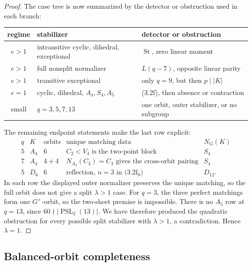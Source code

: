 \documentclass[11pt]{article}
\theoremstyle{definition}
\theoremstyle{remark}
\begin{document}
\begin{proof}
The case tree is now summarized by the detector or obstruction used in
each branch:
\begin{center}
\small
\begin{tabular}{@{}c@{\quad}l@{\quad}l@{}}
\toprule
regime & stabilizer & detector or obstruction\\
\midrule
\(e>1\) & intransitive cyclic, dihedral, exceptional
  & \(\operatorname{St}\), zero linear moment\\
\(e>1\) & full nonsplit normalizer
  & \(L(q-7)\), opposite linear parity\\
\(e>1\) & transitive exceptional
  & only \(q=9\), but then \(p\mid |K|\)\\
\(e=1\) & cyclic, dihedral, \(A_4,S_4,A_5\)
  & (3.2f), then absence or contraction\\
small & \(q=3,5,7,13\)
  & one orbit, outer stabilizer, or no subgroup\\
\bottomrule
\end{tabular}
\end{center}
The remaining endpoint statements make the last row explicit:
\[
\begin{array}{c|c|c|c|c}
q&K&\text{orbits}&\text{unique matching data}&N_G(K)\\ \hline
5&A_4&6&C_2<V_4\text{ is the two-point block}&S_4\\
7&A_4&4+4&
 N_{A_4}(C_3)=C_3\text{ gives the cross-orbit pairing}&S_4\\
5&D_6&6&\text{reflection, }n=3\text{ in (3.2f$_0$)}&D_{12}.
\end{array}                                               \tag{3.2g$_0$}
\]
In each row the displayed outer normalizer preserves the unique
matching, so the full orbit does not give a split \(\lambda>1\) case.
For \(q=3\), the
three perfect matchings form one \(G^+\)-orbit, so the two-sheet premise
is impossible.  There is no \(A_5\) row at \(q=13\), since
\(60\nmid|\operatorname{PSL}_2(13)|\).  We have therefore produced the
quadratic obstruction for every
possible split stabilizer with \(\lambda>1\), a contradiction.
Hence \(\lambda=1\).
\end{proof}

\subsection{Balanced-orbit completeness}
\end{document}
